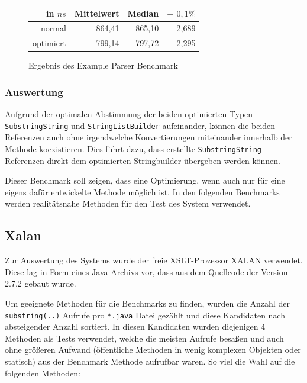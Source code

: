 \begin{figure}[H]
{	}

	
	\begin{table}[H]
	\centering
		\begin{tabular}{|r|r|r|r|}
			\hline
		   	in $ns$   & Mittelwert & Median & \bf{$\pm$ $0,1\%$} \\
		 	\hline
		 	\hline
		 	normal    & 864,41 & 865,10 & 2,689 \\ 
		  	optimiert & 799,14 & 797,72 & 2,295 \\
		  	\hline
		  	
		\end{tabular}
	\end{table}

	\caption{Ergebnis des Example Parser Benchmark}\label{bp:exampleBench}
\end{figure}


\subsubsection{Auswertung}

Aufgrund der optimalen Abstimmung der beiden optimierten Typen \texttt{SubstringString} und
\texttt{StringListBuilder} aufeinander, können die beiden Referenzen auch ohne irgendwelche 
Konvertierungen miteinander innerhalb der Methode koexistieren. Dies führt dazu, dass
erstellte \texttt{SubstringString} Referenzen direkt dem optimierten Stringbuilder übergeben
werden können. 

Dieser Benchmark soll zeigen, dass eine Optimierung, wenn auch nur für eine eigens dafür 
entwickelte Methode möglich ist. In den folgenden Benchmarks werden realitätsnahe Methoden für 
den Test des System verwendet.
 
\subsection{Xalan}

Zur Auswertung des Systems wurde der freie XSLT-Prozessor XALAN verwendet. Diese lag in Form 
eines Java Archivs vor, dass aus dem Quellcode der Version 2.7.2 gebaut wurde. 

Um geeignete Methoden für die Benchmarks zu finden, wurden die Anzahl der \texttt{substring(..)}
Aufrufe pro \texttt{*.java} Datei gezählt und diese Kandidaten nach absteigender Anzahl sortiert.
In diesen Kandidaten wurden diejenigen 4 Methoden als Tests verwendet, welche die meisten 
Aufrufe besaßen und auch ohne größeren Aufwand (öffentliche Methoden in wenig komplexen Objekten 
oder statisch) aus der Benchmark Methode aufrufbar waren. So viel die Wahl auf die folgenden 
Methoden:

